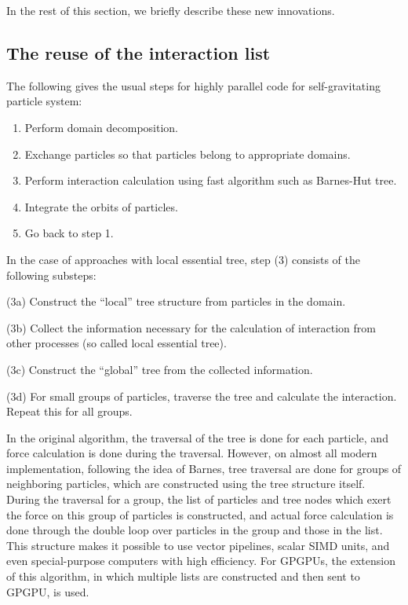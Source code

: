 \documentclass[conference]{IEEEtran}
\begin{document}
In the rest of this section, we briefly describe these new innovations.

\subsection{The reuse of the interaction list}
\label{subsec:list}


The following gives the usual steps for highly parallel code for
self-gravitating particle system:

\begin{enumerate}

  \item Perform domain decomposition.
  \item Exchange particles so that particles belong to appropriate domains.
  \item Perform interaction calculation using fast algorithm such as
    Barnes-Hut tree.
  \item Integrate the orbits of particles.
  \item Go back to step 1.

\end{enumerate}

In the case of approaches with local essential tree, step (3) consists
of the following substeps:

\begin{description}

\item{(3a)} Construct the ``local'' tree structure from particles in
  the domain.
\item{(3b)} Collect the information necessary for the calculation of
  interaction from other processes (so called local essential tree).
\item{(3c)} Construct the ``global'' tree from the collected information.
\item{(3d)} For small groups of particles, traverse the tree and
  calculate the interaction. Repeat this for all groups.
\end{description}
In the original algorithm\cite{BarnesHut1986}, the traversal of the
tree is done for each particle, and force calculation is done during
the traversal. However, on almost all modern implementation, following
the idea of Barnes\cite{Barnes1990}, tree traversal are done for
groups of neighboring particles, which are constructed using the tree
structure itself. During the traversal for a group, the list of
particles and tree nodes which exert the force on this group of
particles is constructed, and actual force calculation is done through
the double loop over particles in the group and those in the
list. This structure makes it possible to use vector pipelines, scalar
SIMD units, and even special-purpose computers\cite{Makino1991c} with
high efficiency. For GPGPUs, the extension of this algorithm, in which
multiple lists are constructed and then sent to GPGPU, is
used\cite{Hamadaetal2009}.
\end{document}
